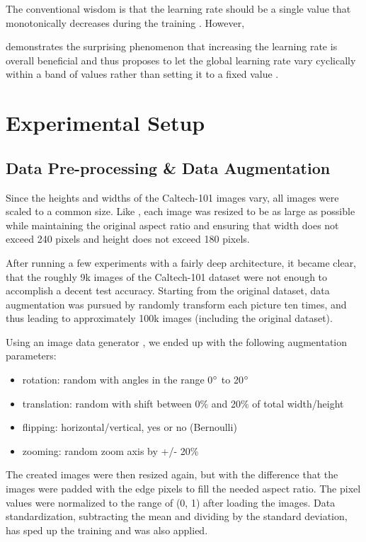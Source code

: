 \documentclass[a4paper, 11pt]{article}
\newcommand*{\nolink}[1]{%
	\begin{NoHyper}#1\end{NoHyper}%
}
\begin{document}
The conventional wisdom is that the learning rate should be a single value that monotonically decreases during the training \cite{Smith2015}.
However, \nolink{\citeauthor{Smith2015}} demonstrates the surprising phenomenon that increasing the learning rate is overall beneficial and thus proposes to let the global learning rate vary cyclically within a band of values rather than setting it to a fixed value \cite{Smith2015}.



\section{Experimental Setup}

\subsection{Data Pre-processing \& Data Augmentation}
Since the heights and widths of the Caltech-101 images vary, all images were scaled to a common size. 
Like \citet{Orchard2015}, each image was resized to be as large as possible while maintaining the original aspect ratio and ensuring that width does not exceed 240 pixels and height does not exceed 180 pixels.

After running a few experiments with a fairly deep architecture, it became clear, that the roughly 9k images of the Caltech-101 dataset were not enough to accomplish a decent test accuracy.
Starting from the original dataset, data augmentation was pursued by randomly transform each picture ten times, and thus leading to approximately 100k images (including the original dataset).

Using an image data generator \cite{keras}, we ended up with the following augmentation parameters:
\begin{itemize}
	\item rotation: random with angles in the range 0$\degree$ to 20$\degree$
	\item translation: random with shift between 0\% and 20\% of total width/height
	\item flipping: horizontal/vertical, yes or no (Bernoulli)
	\item zooming: random zoom axis by +/- 20\%
\end{itemize}

The created images were then resized again, but with the difference that the images were padded with the edge pixels to fill the needed aspect ratio.
The pixel values were normalized to the range of (0, 1) after loading the images.
Data standardization, subtracting the mean and dividing by the standard deviation, has sped up the training and was also applied.\\
\end{document}
